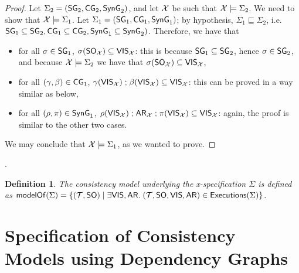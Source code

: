 \documentclass[a4paper,UKenglish]{article}%
\newif\ifdraft
\newcommand{\ac}[1]{\ifdraft{}{\color{blue}#1}\else{}\fi}
\newtheorem{definition}[theorem]{Definition}
\theoremstyle{plain}
\begin{document}
\begin{proof}
Let $\Sigma_2 = (\mathsf{SG}_2, \mathsf{CG}_2, \mathsf{SynG}_2)$, and let 
$\mathcal{X}$ be such that $\mathcal{X} \models \Sigma_2$. We need to show 
that $\mathcal{X} \models \Sigma_1$. Let $\Sigma_1 = (\mathsf{SG}_1, \mathsf{CG}_1, \mathsf{SynG}_1)$;  
by hypothesis, $\Sigma_1 \sqsubseteq \Sigma_2$, i.e. $\mathsf{SG}_1 \subseteq \mathsf{SG}_2, 
\mathsf{CG}_1 \subseteq \mathsf{CG}_2, \mathsf{SynG}_1 \subseteq \mathsf{SynG}_2)$. Therefore, we have that 
\begin{itemize}
\item for all $\sigma \in \mathsf{SG}_1$, $\sigma({\sf{SO}}_{\mathcal{X}}) \subseteq {\mathsf{VIS}}_{\mathcal{X}}$: 
this is because $\mathsf{SG}_1 \subseteq \mathsf{SG}_2$, hence $\sigma \in \mathsf{SG}_2$, and 
because $\mathcal{X} \models \Sigma_2$ we have that $\sigma({\sf{SO}}_{\mathcal{X}}) \subseteq {\mathsf{VIS}}_{\mathcal{X}}$, 
\item for all $(\gamma, \beta) \in \mathsf{CG}_1$, $\gamma({\mathsf{VIS}}_{\mathcal{X}}) \mathrel{;} \beta({\mathsf{VIS}}_{\mathcal{X}}) \subseteq 
{\mathsf{VIS}}_{\mathcal{X}}$: this can be proved in a way similar as below, 
\item for all $(\rho, \pi) \in \mathsf{SynG}_1$, $\rho({\mathsf{VIS}}_{\mathcal{X}}) \mathrel{;} {\sf{AR}}_{\mathcal{X}} \mathrel{;} \pi({\mathsf{VIS}}_{\mathcal{X}}) \subseteq {\mathsf{VIS}}_{\mathcal{X}}$: 
again, the proof is similar to the other two cases.
\end{itemize}
We may conclude that $\mathcal{X} \models \Sigma_1$, as we wanted to prove.
\end{proof}

\ac{Todo: I never checked thoroughly that the definitions of Session Guarantees 
and Causality Guarantees are the appropriate ones. Some examples of consistency 
models that can be captured are necessary here.}
\ac{Also todo: I remember that I needed the constraint that $\rho(\VIS) \subseteq \VIS?$ 
back when the definition of specification functions was quite restrictive, but I am 
not sure whether I have used this anywhere. It could be that I can replace $\rho(\VIS)$ 
without losing any of the results in CONCUR}.


\begin{definition}
The consistency model underlying the x-specification $\Sigma$ is defined as $
\mathsf{modelOf}(\Sigma) = \{(\mathcal{T}, {\sf{SO}}) \mid 
\exists {\mathsf{VIS}}, {\sf{AR}}.\; (\mathcal{T}, {\sf{SO}}, {\mathsf{VIS}}, {\sf{AR}}) \in {\mathsf{Executions}}(\Sigma)\}$.
\end{definition}

\section{Specification of Consistency Models using Dependency Graphs} 
\end{document}
